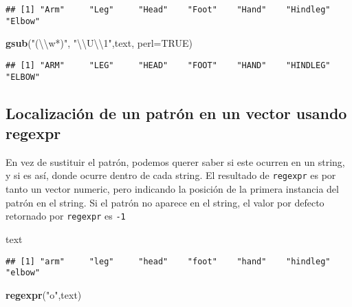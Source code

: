 \documentclass[]{article}
\newenvironment{Shaded}{\begin{snugshade}}{\end{snugshade}}
\newcommand{\KeywordTok}[1]{\textcolor[rgb]{0.13,0.29,0.53}{\textbf{#1}}}
\newcommand{\DataTypeTok}[1]{\textcolor[rgb]{0.13,0.29,0.53}{#1}}
\newcommand{\CharTok}[1]{\textcolor[rgb]{0.31,0.60,0.02}{#1}}
\newcommand{\StringTok}[1]{\textcolor[rgb]{0.31,0.60,0.02}{#1}}
\newcommand{\OtherTok}[1]{\textcolor[rgb]{0.56,0.35,0.01}{#1}}
\newcommand{\NormalTok}[1]{#1}
\begin{document}
\begin{verbatim}
## [1] "Arm"     "Leg"     "Head"    "Foot"    "Hand"    "Hindleg" "Elbow"
\end{verbatim}

\begin{Shaded}
\begin{Highlighting}[]
\KeywordTok{gsub}\NormalTok{(}\StringTok{"(}\CharTok{\textbackslash{}\textbackslash{}}\StringTok{w*)"}\NormalTok{, }\StringTok{"}\CharTok{\textbackslash{}\textbackslash{}}\StringTok{U}\CharTok{\textbackslash{}\textbackslash{}}\StringTok{1"}\NormalTok{,text, }\DataTypeTok{perl=}\OtherTok{TRUE}\NormalTok{)}
\end{Highlighting}
\end{Shaded}

\begin{verbatim}
## [1] "ARM"     "LEG"     "HEAD"    "FOOT"    "HAND"    "HINDLEG" "ELBOW"
\end{verbatim}

\subsection{Localización de un patrón en un vector usando
regexpr}\label{localizaciuxf3n-de-un-patruxf3n-en-un-vector-usando-regexpr}

En vez de sustituir el patrón, podemos querer saber si este ocurren en
un string, y si es así, donde ocurre dentro de cada string. El resultado
de \texttt{regexpr} es por tanto un vector numeric, pero indicando la
posición de la primera instancia del patrón en el string. Si el patrón
no aparece en el string, el valor por defecto retornado por
\texttt{regexpr} es \texttt{-1}

\begin{Shaded}
\begin{Highlighting}[]
\NormalTok{text}
\end{Highlighting}
\end{Shaded}

\begin{verbatim}
## [1] "arm"     "leg"     "head"    "foot"    "hand"    "hindleg" "elbow"
\end{verbatim}

\begin{Shaded}
\begin{Highlighting}[]
\KeywordTok{regexpr}\NormalTok{(}\StringTok{"o"}\NormalTok{,text)}
\end{Highlighting}
\end{Shaded}
\end{document}
